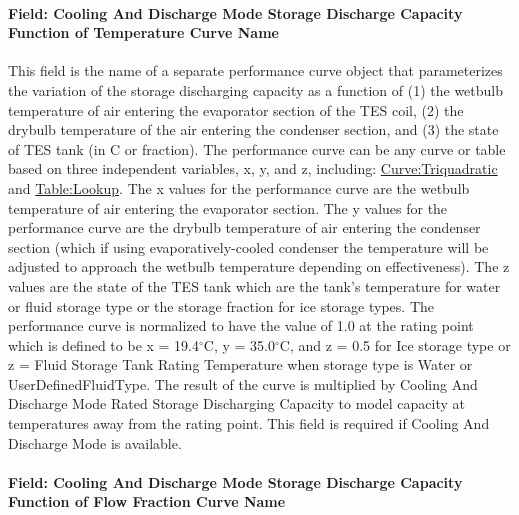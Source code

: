 \paragraph{Field: Cooling And Discharge Mode Storage Discharge Capacity Function of Temperature Curve Name}\label{field-cooling-and-discharge-mode-storage-discharge-capacity-function-of-temperature-curve-name}

This field is the name of a separate performance curve object that parameterizes the variation of the storage discharging capacity as a function of (1) the wetbulb temperature of air entering the evaporator section of the TES coil, (2) the drybulb temperature of the air entering the condenser section, and (3) the state of TES tank (in C or fraction). The performance curve can be any curve or table based on three independent variables, x, y, and z, including: \hyperref[curvetriquadratic]{Curve:Triquadratic} and \hyperref[tablelookup]{Table:Lookup}. The x values for the performance curve are the wetbulb temperature of air entering the evaporator section. The y values for the performance curve are the drybulb temperature of air entering the condenser section (which if using evaporatively-cooled condenser the temperature will be adjusted to approach the wetbulb temperature depending on effectiveness). The z values are the state of the TES tank which are the tank's temperature for water or fluid storage type or the storage fraction for ice storage types. The performance curve is normalized to have the value of 1.0 at the rating point which is defined to be x = 19.4$^\circ$C, y = 35.0$^\circ$C, and z = 0.5 for Ice storage type or z = Fluid Storage Tank Rating Temperature when storage type is Water or UserDefinedFluidType. The result of the curve is multiplied by Cooling And Discharge Mode Rated Storage Discharging Capacity to model capacity at temperatures away from the rating point. This field is required if Cooling And Discharge Mode is available.

\paragraph{Field: Cooling And Discharge Mode Storage Discharge Capacity Function of Flow Fraction Curve Name}\label{field-cooling-and-discharge-mode-storage-discharge-capacity-function-of-flow-fraction-curve-name}

